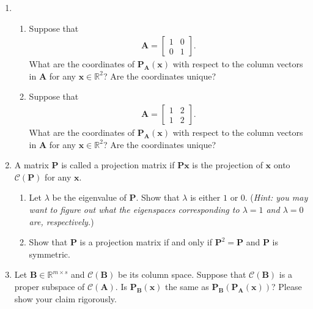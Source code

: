 \documentclass[11pt,letter,notitlepage]{article}
\newcommand{\proj}[2]{\textbf{P}_{#2} (#1)}
\theoremstyle{definition}
\begin{document}
\begin{exercise}[Projection ]
\begin{enumerate}
			\item  
			\begin{enumerate}
				\item Suppose that 
				\begin{align*}
					\mathbf{A} = \left[
					\begin{matrix}
						1 & 0\\
						0 & 1
					\end{matrix}
					\right] .
				\end{align*}
				What are the coordinates of $\mathbf{P}_{\mathbf{A}}(\mathbf{x})$ with respect to the column vectors in $\mathbf{A}$ for any $\mathbf{x} \in \mathbb{R}^2$? Are the coordinates unique?
				\item Suppose that
				\begin{align*}
					\mathbf{A} = \left[
					\begin{matrix}
						1 & 2\\
						1 & 2
					\end{matrix}
					\right] .
				\end{align*}
				What are the coordinates of $\mathbf{P}_{\mathbf{A}}(\mathbf{x})$ with respect to the column vectors in $\mathbf{A}$ for any $\mathbf{x} \in \mathbb{R}^2$? Are the coordinates unique?
			\end{enumerate}
			
			\item A matrix $\mathbf{P}$ is called a projection matrix if $\mathbf{P}\mathbf{x}$ is the projection of $\mathbf{x}$ onto $\mathcal{C}(\mathbf{P})$ for any $\mathbf{x}$.
			\begin{enumerate}
				\item Let $\lambda$ be the eigenvalue of $\mathbf{P}$. Show that $\lambda$ is either $1$ or $0$. (\emph{Hint: you may want to figure out what the eigenspaces corresponding to $\lambda=1$ and $\lambda=0$ are, respectively.})
				\item Show that $\mathbf{P}$ is a projection matrix if and only if $\mathbf{P}^2 = \mathbf{P}$ and $\mathbf{P}$ is symmetric.
			\end{enumerate}
			
			\item Let $\mathbf{B} \in \mathbb{R}^{m\times s}$ and $\mathcal{C}(\mathbf{B}) $ be its column space. Suppose that $\mathcal{C}(\mathbf{B})$ is a proper subspace of $ \mathcal{C}(\mathbf{A})$. 
			Is $\proj{\mathbf{x}}{\mathbf{B}}$ the same as $\proj{\proj{\mathbf{x}}{\mathbf{A}}}{\mathbf{B}}$? Please show your claim rigorously.
		\end{enumerate}
	\end{exercise}
\end{document}
